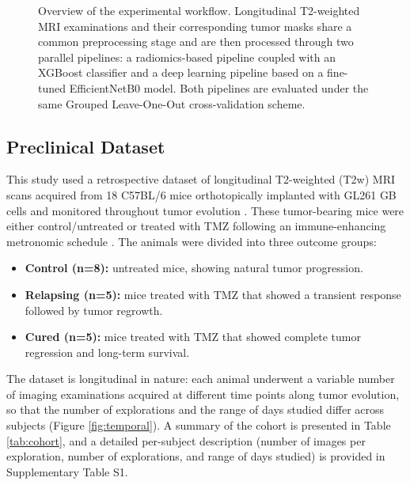 \documentclass{article}
\begin{document}
\begin{figure}[H]
{%
}
\caption{Overview of the experimental workflow. Longitudinal T2-weighted MRI examinations and their corresponding tumor masks share a common preprocessing stage and are then processed through two parallel pipelines: a radiomics-based pipeline coupled with an XGBoost classifier and a deep learning pipeline based on a fine-tuned EfficientNetB0 model. Both pipelines are evaluated under the same Grouped Leave-One-Out cross-validation scheme.}
\label{fig:pipeline}
\end{figure}

\subsection{Preclinical Dataset}

This study used a retrospective dataset of longitudinal T2-weighted (T2w) MRI scans acquired from 18 C57BL/6 mice orthotopically implanted with GL261 GB cells and monitored throughout tumor evolution \cite{Wu2020}. These tumor-bearing mice were either control/untreated or treated with TMZ following an immune-enhancing metronomic schedule \cite{Wu2015}. The animals were divided into three outcome groups:
\begin{itemize}
    \item \textbf{Control (n=8):} untreated mice, showing natural tumor progression.
    \item \textbf{Relapsing (n=5):} mice treated with TMZ that showed a transient response followed by tumor regrowth.
    \item \textbf{Cured (n=5):} mice treated with TMZ that showed complete tumor regression and long-term survival.
\end{itemize}

The dataset is longitudinal in nature: each animal underwent a variable number of imaging examinations acquired at different time points along tumor evolution, so that the number of explorations and the range of days studied differ across subjects (Figure \ref{fig:temporal}). A summary of the cohort is presented in Table \ref{tab:cohort}, and a detailed per-subject description (number of images per exploration, number of explorations, and range of days studied) is provided in Supplementary Table S1.
\end{document}
